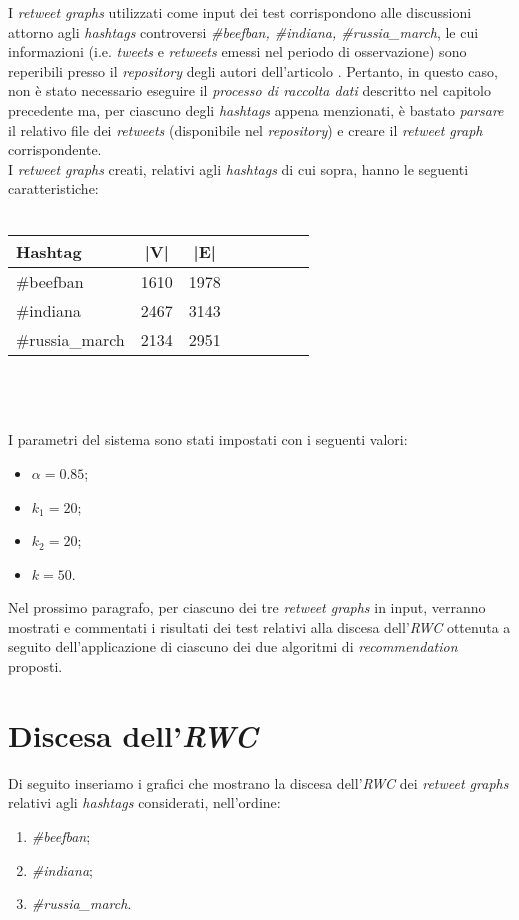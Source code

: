 I \textit{retweet graphs} utilizzati come input dei test corrispondono alle discussioni attorno agli \textit{hashtags} controversi \textit{\#beefban, \#indiana, \#russia\_march}, le cui informazioni (i.e. \textit{tweets} e \textit{retweets} emessi nel periodo di osservazione) sono reperibili presso il \textit{repository} degli autori dell'articolo \cite{garimella:paper}. Pertanto, in questo caso, non è stato necessario eseguire il \textit{processo di raccolta dati} descritto nel capitolo precedente ma, per ciascuno degli \textit{hashtags} appena menzionati, è bastato \textit{parsare} il relativo file dei \textit{retweets} (disponibile nel \textit{repository}) e creare il \textit{retweet graph} corrispondente.
\\I \textit{retweet graphs} creati, relativi agli \textit{hashtags} di cui sopra, hanno le seguenti caratteristiche:
\\\\
\begin{tabular}{l*{6}{c}r}
\textbf{Hashtag}         & \textbf{|V|} & \textbf{|E|}  \\
\hline
\#beefban 		 & 1610 & 1978  \\
\#indiana        	 & 2467 & 3143  \\
\#russia\_march   	 & 2134 & 2951  \\
\end{tabular}
\\\\\\
I parametri del sistema sono stati impostati con i seguenti valori:
\begin{itemize}
\item $\alpha = 0.85$;
\item $k_1 = 20$; 
\item $k_2 = 20$;
\item $k = 50$.
\end{itemize}
Nel prossimo paragrafo, per ciascuno dei tre \textit{retweet graphs} in input, verranno mostrati e commentati i risultati dei test relativi alla discesa dell'\textit{RWC} ottenuta a seguito dell'applicazione di ciascuno dei due algoritmi di \textit{recommendation} proposti. 

\section{Discesa dell'\textit{RWC}}

Di seguito inseriamo i grafici che mostrano la discesa dell'\textit{RWC} dei \textit{retweet graphs} relativi agli \textit{hashtags} considerati, nell'ordine:
\begin{enumerate}
\item \textit{\#beefban};
\item \textit{\#indiana};
\item \textit{\#russia\_march}.
\end{enumerate}

